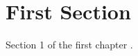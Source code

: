 \section{First Section}
Section 1 of the first chapter \cite{exemplochapter1sec1} \cite{artigo2024chapter1sec1}.

\printbibliography[heading=subbibliography, title={Referências da Seção 1.1}, keyword=chapter1secao1]